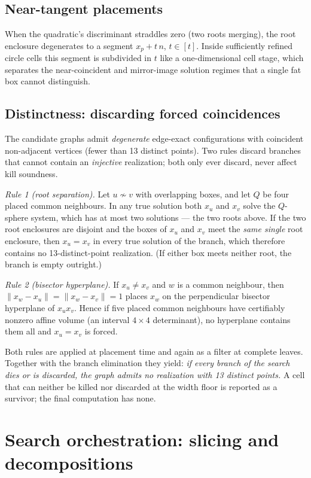 \documentclass[11pt]{article}
\newcommand{\iv}[1]{[#1]}
\begin{document}
\subsection{Near-tangent placements}
When the quadratic's discriminant straddles zero (two roots merging), the root
enclosure degenerates to a segment $x_p+t\,n$, $t\in\iv{t}$. Inside
sufficiently refined circle cells this segment is subdivided in $t$ like a
one-dimensional cell stage, which separates the near-coincident and
mirror-image solution regimes that a single fat box cannot distinguish.

\subsection{Distinctness: discarding forced coincidences}
\label{app:coinc}
The candidate graphs admit \emph{degenerate} edge-exact configurations with
coincident non-adjacent vertices (fewer than 13 distinct points). Two rules
discard branches that cannot contain an \emph{injective} realization; both
only ever discard, never affect kill soundness.

\emph{Rule 1 (root separation).} Let $u\not\sim v$ with overlapping boxes, and
let $Q$ be four placed common neighbours. In any true solution both $x_u$ and
$x_v$ solve the $Q$-sphere system, which has at most two solutions --- the two
roots above. If the two root enclosures are disjoint and the boxes of $x_u$
and $x_v$ meet the \emph{same single} root enclosure, then $x_u=x_v$ in every
true solution of the branch, which therefore contains no 13-distinct-point
realization. (If either box meets neither root, the branch is empty outright.)

\emph{Rule 2 (bisector hyperplane).} If $x_u\ne x_v$ and $w$ is a common
neighbour, then $\lVert x_w-x_u\rVert=\lVert x_w-x_v\rVert=1$ places $x_w$ on
the perpendicular bisector hyperplane of $x_u x_v$. Hence if five placed
common neighbours have certifiably nonzero affine volume (an interval
$4\times4$ determinant), no hyperplane contains them all and $x_u=x_v$ is
forced.

Both rules are applied at placement time and again as a filter at complete
leaves. Together with the branch elimination they yield: \emph{if every branch
of the search dies or is discarded, the graph admits no realization with 13
distinct points.} A cell that can neither be killed nor discarded at the width
floor is reported as a survivor; the final computation has none.

\section{Search orchestration: slicing and decompositions}
\label{app:orch}
\end{document}
